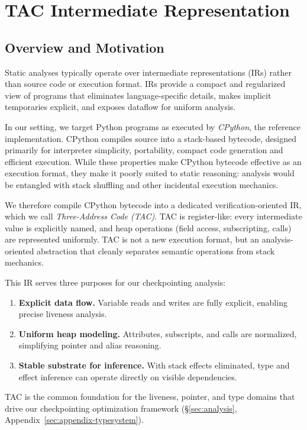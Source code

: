 \section{TAC Intermediate Representation}
\label{sec:appendix-tac-ir}

\subsection{Overview and Motivation}

Static analyses typically operate over intermediate representations (IRs) rather than source code or execution format. IRs provide a compact and regularized view of programs that eliminates language-specific details, makes implicit temporaries explicit, and exposes dataflow for uniform analysis.

In our setting, we target Python programs as executed by \emph{CPython}, the reference implementation.  
CPython compiles source into a stack-based bytecode, designed primarily for interpreter simplicity, portability, compact code generation and efficient execution. 
While these properties make CPython bytecode effective as an execution format, they make it poorly suited to static reasoning: analysis would be entangled with stack shuffling and other incidental execution mechanics.

We therefore compile CPython bytecode into a dedicated verification-oriented IR, which we call \emph{Three-Address Code (TAC)}.  
TAC is register-like: every intermediate value is explicitly named, and heap operations (field access, subscripting, calls) are represented uniformly.  
TAC is not a new execution format, but an analysis-oriented abstraction that cleanly separates semantic operations from stack mechanics.

This IR serves three purposes for our checkpointing analysis:
\begin{enumerate}
    \item \textbf{Explicit data flow.} Variable reads and writes are fully explicit, enabling precise liveness analysis.
    \item \textbf{Uniform heap modeling.} Attributes, subscripts, and calls are normalized, simplifying pointer and alias reasoning.
    \item \textbf{Stable substrate for inference.} With stack effects eliminated, type and effect inference can operate directly on visible dependencies.
\end{enumerate}

TAC is the common foundation for the liveness, pointer, and type domains that drive our checkpointing optimization framework (\S\ref{sec:analysis}, Appendix~\ref{sec:appendix-typesystem}).

